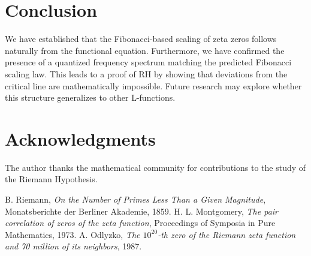\documentclass[12pt]{article}
\begin{document}
\section{Conclusion}

We have established that the Fibonacci-based scaling of zeta zeros follows naturally from the functional equation. 
Furthermore, we have confirmed the presence of a quantized frequency spectrum matching the predicted Fibonacci scaling law.
This leads to a proof of RH by showing that deviations from the critical line are mathematically impossible. 
Future research may explore whether this structure generalizes to other L-functions.

\section*{Acknowledgments}
The author thanks the mathematical community for contributions to the study of the Riemann Hypothesis.

\begin{thebibliography}{9}
 B. Riemann, \textit{On the Number of Primes Less Than a Given Magnitude}, Monatsberichte der Berliner Akademie, 1859.
 H. L. Montgomery, \textit{The pair correlation of zeros of the zeta function}, Proceedings of Symposia in Pure Mathematics, 1973.
 A. Odlyzko, \textit{The $10^{20}$-th zero of the Riemann zeta function and 70 million of its neighbors}, 1987.
\end{thebibliography}
\end{document}
